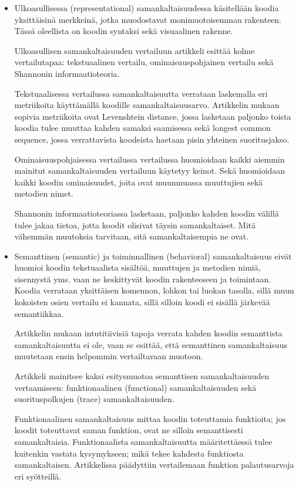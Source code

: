 \documentclass[finnish]{../tktltiki2}
\theoremstyle{definition}
\theoremstyle{remark}
\begin{document}
\begin{itemize}
\item{Ulkoasullisessa (representational)}
samankaltaisuudessa käsitellään koodia yksittäisinä merkkeinä, jotka muodostavat monimuotoisemman rakenteen. Tässä oleellista on koodin syntaksi sekä visuaalinen rakenne.

Ulkoasullisen samankaltaisuuden vertailuun artikkeli esittää kolme vertailutapaa: tekstuaalinen vertailu, ominaisuuspohjainen vertailu sekä Shannonin informaatioteoria.

Tekstuaalisessa vertailussa samankaltaisuutta verrataan laskemalla eri metriikoita käyttämällä koodille samankaltaisuusarvo. Artikkelin mukaan sopivia metriikoita ovat Levenshtein distance, jossa lasketaan paljonko toista koodia tulee muuttaa kahden samaksi saamisessa sekä longest common sequence, jossa verrattavista koodeista haetaan pisin yhteinen suoritusjakso.

Ominaisuuspohjaisessa vertailussa vertailussa huomioidaan kaikki aiemmin mainitut samankaltaisuuden vertailuun käytetyy keinot. Sekä huomioidaan kaikki koodin ominaisuudet, joita ovat muunmuassa muuttujien sekä metodien nimet.

Shannonin informaatioteoriassa lasketaan, paljonko kahden koodin välillä tulee jakaa tietoa, jotta koodit olisivat täysin samankaltaiset. Mitä vähemmän muutoksia tarvitaan, sitä samankaltaisempia ne ovat.

\item{Semanttinen (semantic) ja toiminnallinen (behavioral) }
samankaltaisuus eivät huomioi koodin tekstuaalista sisältöä, muuttujen ja metodien nimiä, sisennystä yms. vaan ne keskittyvät koodin rakenteeseen ja toimintaan. Koodia verrataan yksittäisen komennon, lohkon tai luokan tasolla, sillä muun kokoisten osien vertailu ei kannata, sillä silloin koodi ei sisällä järkevää semantiikkaa.

Artikkelin mukaan intutitiivisiä tapoja verrata kahden koodin semanttista samankaltaisuutta ei ole, vaan se esittää, että semanttinen samankaltaisuus muutetaan ensin helpommin vertailtavaan muotoon.

Artikkeli mainitsee kaksi esitysmuotoa semanttisen samankaltaisuuden vertaamiseen: funktionaalinen (functional) samankaltaisuuden sekä suorituspolkujen (trace) samankaltaisuuden.

Funktionaalinen samankaltaisuus mittaa koodin toteuttamia funktioita; jos koodit toteuttavat saman funktion, ovat ne silloin semanttisesti samankaltaisia.
Funktionaalista samankaltaisuutta määritettäessä tulee kuitenkin vastata kysymykseen; mikä tekee kahdesta funktiosta samankaltaisen. Artikkelissa päädyttiin vertailemaan funktion palautusarvoja eri syötteillä.


\end{itemize}
\end{document}

